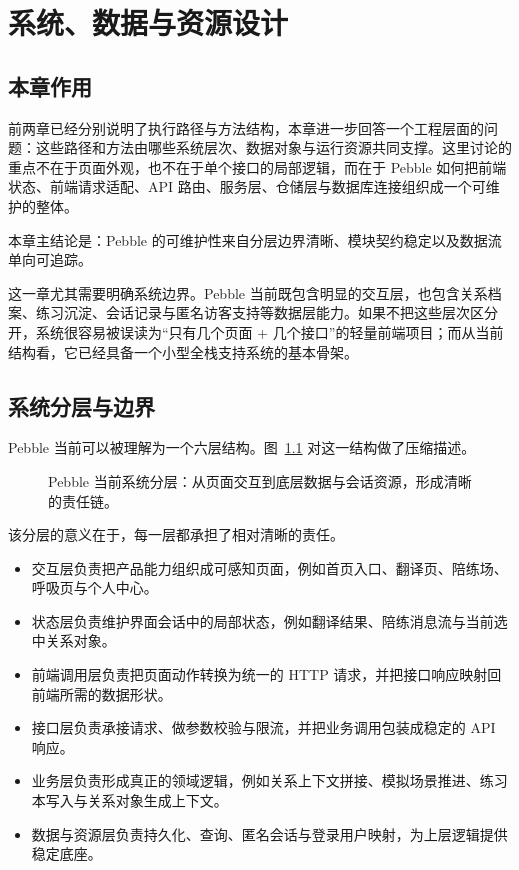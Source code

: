 \chapter{系统、数据与资源设计}

\section{本章作用}

前两章已经分别说明了执行路径与方法结构，本章进一步回答一个工程层面的问题：这些路径和方法由哪些系统层次、数据对象与运行资源共同支撑。这里讨论的重点不在于页面外观，也不在于单个接口的局部逻辑，而在于 Pebble 如何把前端状态、前端请求适配、API 路由、服务层、仓储层与数据库连接组织成一个可维护的整体。

本章主结论是：Pebble 的可维护性来自分层边界清晰、模块契约稳定以及数据流单向可追踪。

这一章尤其需要明确系统边界。Pebble 当前既包含明显的交互层，也包含关系档案、练习沉淀、会话记录与匿名访客支持等数据层能力。如果不把这些层次区分开，系统很容易被误读为“只有几个页面 + 几个接口”的轻量前端项目；而从当前结构看，它已经具备一个小型全栈支持系统的基本骨架。

\section{系统分层与边界}

Pebble 当前可以被理解为一个六层结构。图~\ref{fig:pebble-system-layers} 对这一结构做了压缩描述。

\begin{figure}[H]
  \centering
  
  \caption{Pebble 当前系统分层：从页面交互到底层数据与会话资源，形成清晰的责任链。}
  \label{fig:pebble-system-layers}
\end{figure}

该分层的意义在于，每一层都承担了相对清晰的责任。

\begin{itemize}
  \item 交互层负责把产品能力组织成可感知页面，例如首页入口、翻译页、陪练场、呼吸页与个人中心。
  \item 状态层负责维护界面会话中的局部状态，例如翻译结果、陪练消息流与当前选中关系对象。
  \item 前端调用层负责把页面动作转换为统一的 HTTP 请求，并把接口响应映射回前端所需的数据形状。
  \item 接口层负责承接请求、做参数校验与限流，并把业务调用包装成稳定的 API 响应。
  \item 业务层负责形成真正的领域逻辑，例如关系上下文拼接、模拟场景推进、练习本写入与关系对象生成上下文。
  \item 数据与资源层负责持久化、查询、匿名会话与登录用户映射，为上层逻辑提供稳定底座。
\end{itemize}


